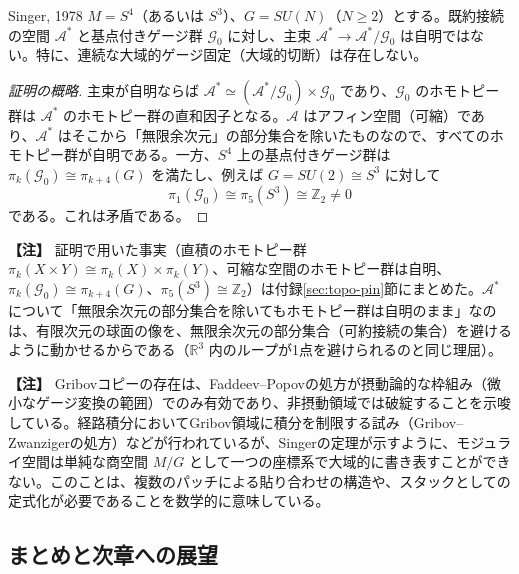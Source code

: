 \documentclass[uplatex, dvipdfmx, book]{jsbook}
\let\origsubsection\subsection
\let\origsubsubsection\subsubsection
\renewcommand{\section}{\origsubsection}
\renewcommand{\subsection}{\origsubsubsection}
\renewcommand{\subsubsection}{\paragraph}
\newenvironment{note}{\vspace{1ex}\par\footnotesize\noindent\textbf{【注】}}{\par\vspace{1ex}}
\begin{document}
\begin{mythm}{Singer, 1978}{}
$M = S^4$（あるいは $S^3$）、$G = SU(N)$（$N \ge 2$）とする。既約接続の空間 $\mathcal{A}^*$ と基点付きゲージ群 $\mathcal{G}_0$ に対し、主束 $\mathcal{A}^* \to \mathcal{A}^*/\mathcal{G}_0$ は自明ではない。特に、連続な大域的ゲージ固定（大域的切断）は存在しない。
\end{mythm}
\begin{proof}[証明の概略]
主束が自明ならば $\mathcal{A}^* \simeq (\mathcal{A}^*/\mathcal{G}_0) \times \mathcal{G}_0$ であり、$\mathcal{G}_0$ のホモトピー群は $\mathcal{A}^*$ のホモトピー群の直和因子となる。$\mathcal{A}$ はアフィン空間（可縮）であり、$\mathcal{A}^*$ はそこから「無限余次元」の部分集合を除いたものなので、すべてのホモトピー群が自明である。一方、$S^4$ 上の基点付きゲージ群は $\pi_k(\mathcal{G}_0) \cong \pi_{k+4}(G)$ を満たし、例えば $G = SU(2) \cong S^3$ に対して
\begin{equation*}
    \pi_1(\mathcal{G}_0) \cong \pi_5(S^3) \cong \mathbb{Z}_2 \neq 0
\end{equation*}
である。これは矛盾である。
\end{proof}

\begin{note}
証明で用いた事実（直積のホモトピー群 $\pi_k(X \times Y) \cong \pi_k(X) \times \pi_k(Y)$、可縮な空間のホモトピー群は自明、$\pi_k(\mathcal{G}_0) \cong \pi_{k+4}(G)$、$\pi_5(S^3) \cong \mathbb{Z}_2$）は付録\ref{sec:topo-pin}節にまとめた。$\mathcal{A}^*$ について「無限余次元の部分集合を除いてもホモトピー群は自明のまま」なのは、有限次元の球面の像を、無限余次元の部分集合（可約接続の集合）を避けるように動かせるからである（$\mathbb{R}^3$ 内のループが1点を避けられるのと同じ理屈）。
\end{note}

\begin{note}
Gribovコピーの存在は、Faddeev--Popovの処方が摂動論的な枠組み（微小なゲージ変換の範囲）でのみ有効であり、非摂動領域では破綻することを示唆している。経路積分においてGribov領域に積分を制限する試み（Gribov--Zwanzigerの処方）などが行われているが、Singerの定理が示すように、モジュライ空間は単純な商空間 $M/G$ として一つの座標系で大域的に書き表すことができない。このことは、複数のパッチによる貼り合わせの構造や、スタックとしての定式化が必要であることを数学的に意味している。
\end{note}

\section{まとめと次章への展望}
\end{document}
